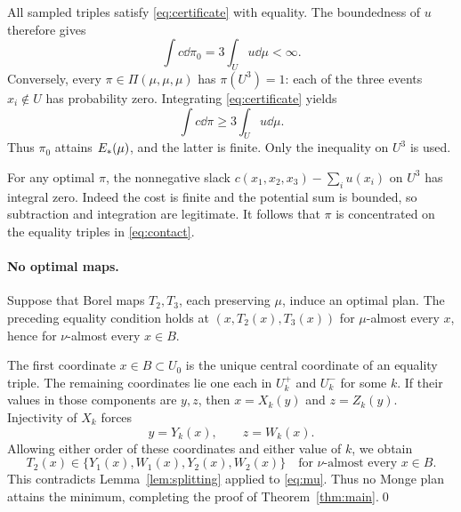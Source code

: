 All sampled triples satisfy \eqref{eq:certificate} with equality.
The boundedness of \(u\) therefore gives
\begin{equation}\label{eq:optimal-value}
 \int c\dd\pi_0=3\int_Uu\dd\mu<\infty.
\end{equation}
Conversely, every \(\pi\in\Pi(\mu,\mu,\mu)\) has
\(\pi(U^3)=1\): each of the three events \(x_i\notin U\)
has probability zero. Integrating \eqref{eq:certificate} yields
\[
 \int c\dd\pi\ge 3\int_Uu\dd\mu.
\]
Thus \(\pi_0\) attains \(E_*(\mu)\), and the latter is finite.
Only the inequality on \(U^3\) is used.

For any optimal \(\pi\), the nonnegative slack
\(c(x_1,x_2,x_3)-\sum_i u(x_i)\) on \(U^3\) has integral zero.
Indeed the cost is finite and the potential sum is bounded, so
subtraction and integration are legitimate.
It follows that \(\pi\) is concentrated on the equality triples
in \eqref{eq:contact}.

\paragraph{No optimal maps.}
Suppose that Borel maps \(T_2,T_3\), each preserving \(\mu\),
induce an optimal plan. The preceding equality condition holds
at \((x,T_2(x),T_3(x))\) for \(\mu\)-almost every \(x\), hence
for \(\nu\)-almost every \(x\in B\).

The first coordinate \(x\in B\subset U_0\) is the unique central
coordinate of an equality triple. The remaining coordinates lie
one each in \(U_k^+\) and \(U_k^-\) for some \(k\).
If their values in those components are \(y,z\), then
\(x=X_k(y)\) and \(z=Z_k(y)\).
Injectivity of \(X_k\) forces
\[
 y=Y_k(x),\qquad z=W_k(x).
\]
Allowing either order of these coordinates and either value of
\(k\), we obtain
\[
 T_2(x)\in\{Y_1(x),W_1(x),Y_2(x),W_2(x)\}
 \quad\text{for \(\nu\)-almost every }x\in B.
\]
This contradicts Lemma~\ref{lem:splitting} applied to
\eqref{eq:mu}. Thus no Monge plan attains the minimum, completing
the proof of Theorem~\ref{thm:main}.\qed

